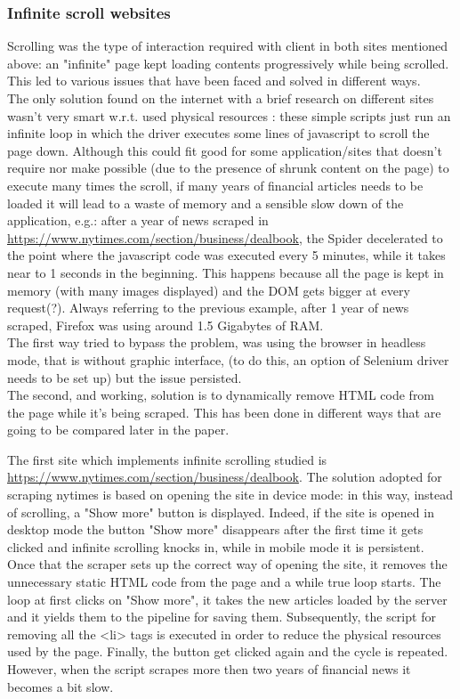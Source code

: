 \subsubsection{Infinite scroll websites}
Scrolling was the type of interaction required with client in both sites mentioned above: an "infinite" page kept loading contents progressively while being scrolled. This led to various issues that have been faced and solved in different ways. \\
The only solution found on the internet with a brief research on different sites wasn't very smart w.r.t. used physical resources \cite{currentscrollsolution}: these simple scripts just run an infinite loop in which the driver executes some lines of javascript to scroll the page down. Although this could fit good for some application/sites that doesn't require nor make possible (due to the presence of shrunk content on the page) to execute many times the scroll, if many years of financial articles needs to be loaded it will lead to a waste of memory and a sensible slow down of the application, e.g.:  after a year of news scraped in \url{https://www.nytimes.com/section/business/dealbook}, the Spider decelerated to the point where the javascript code was executed every 5 minutes, while it takes near to 1 seconds in the beginning. This happens because all the page is kept in memory (with many images displayed) and the DOM gets bigger at every request(?). Always referring to the previous example, after 1 year of news scraped, Firefox was using around 1.5 Gigabytes of RAM. \\
The first way tried to bypass the problem, was using the browser in headless mode, that is without graphic interface, (to do this, an option of Selenium driver needs to be set up) but the issue persisted. \\
The second, and working, solution is to dynamically remove HTML code from the page while it's being scraped. This has been done in different ways that are going to be compared later in the paper. 
\par 
The first site which implements infinite scrolling studied is \url{https://www.nytimes.com/section/business/dealbook}. The solution adopted for scraping nytimes is based on opening the site in device mode: in this way, instead of scrolling, a "Show more" button is displayed. Indeed, if the site is opened in desktop mode the button "Show more" disappears after the first time it gets clicked and infinite scrolling knocks in, while in mobile mode it is persistent. Once that the scraper sets up the correct way of opening the site, it removes the unnecessary static HTML code from the page and a while true loop starts. The loop at first clicks on "Show more", it takes the new articles loaded by the server and it yields them to the pipeline for saving them. Subsequently, the script for removing all the <li> tags is executed in order to reduce the physical resources used by the page. Finally, the button get clicked again and the cycle is repeated. However, when the script scrapes more then two years of financial news it becomes a bit slow. 
